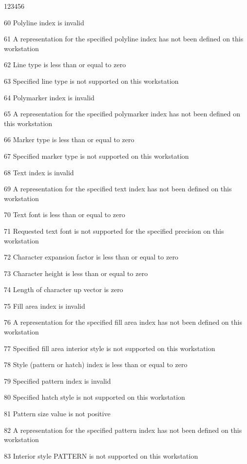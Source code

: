 \begin{DLtt}{123456}
\item[60]
Polyline index is invalid
\item[61]
A representation for the specified polyline index has not been defined
on this workstation
\item[62]
Line type is less than or equal to zero
\item[63]
Specified line type is not supported on this workstation
\item[64]
Polymarker index is invalid
\item[65]
A representation for the specified polymarker index has not been defined
on this workstation
\item[66]
Marker type is less than or equal to zero
\item[67]
Specified marker type is not supported on this workstation
\item[68]
Text index is invalid
\item[69]
A representation for the specified text index has not been defined on
this workstation
\item[70]
Text font is less than or equal to zero
\item[71]
Requested text font is not supported for the specified precision on
this workstation
\item[72]
Character expansion factor is less than or equal to zero
\item[73]
Character height is less than or equal to zero
\item[74]
Length of character up vector is zero
\item[75]
Fill area index is invalid
\item[76]
A representation for the specified fill area index has not been defined
on this workstation
\item[77]
Specified fill area interior style is not supported on this workstation
\item[78]
Style (pattern or hatch) index is less than or equal to zero
\item[79]
Specified pattern index is invalid
\item[80]
Specified hatch style is not supported on this workstation
\item[81]
Pattern size value is not positive
\item[82]
A representation for the specified pattern index has not been defined
on this workstation
\item[83]
Interior style PATTERN is not supported on this workstation

\end{DLtt}
